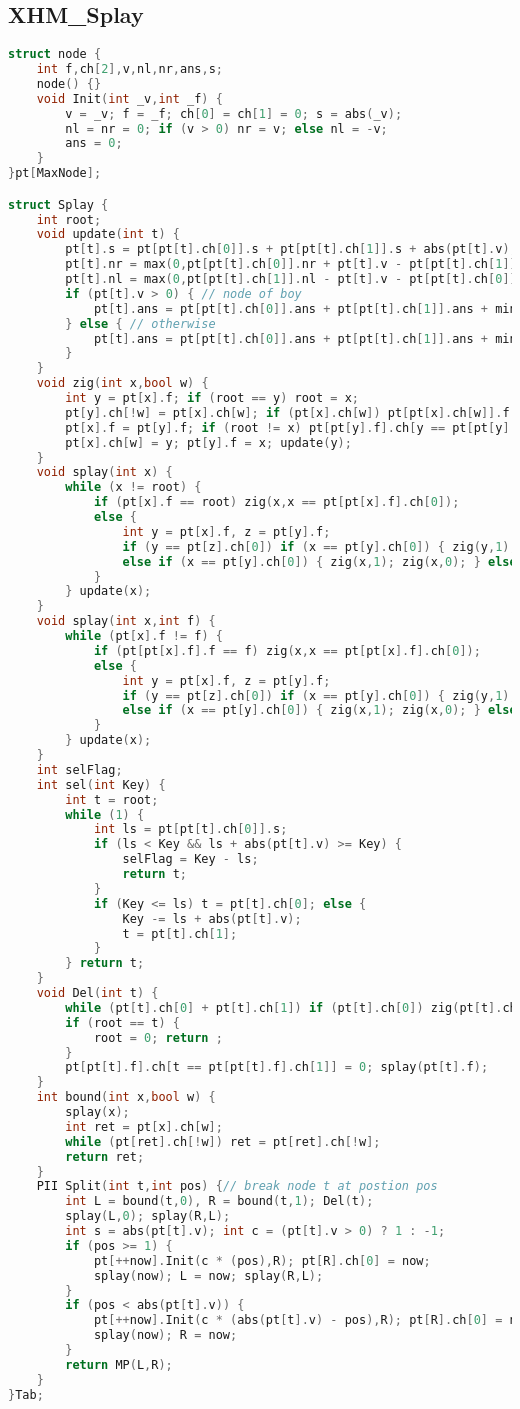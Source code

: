 \subsection{XHM\_Splay}
\begin{lstlisting}[language=C++]
struct node {
	int f,ch[2],v,nl,nr,ans,s;
	node() {}
	void Init(int _v,int _f) {
		v = _v; f = _f; ch[0] = ch[1] = 0; s = abs(_v);
		nl = nr = 0; if (v > 0) nr = v; else nl = -v;
		ans = 0;
	}
}pt[MaxNode];

struct Splay {
	int root;
	void update(int t) {
		pt[t].s = pt[pt[t].ch[0]].s + pt[pt[t].ch[1]].s + abs(pt[t].v);
		pt[t].nr = max(0,pt[pt[t].ch[0]].nr + pt[t].v - pt[pt[t].ch[1]].nl) + pt[pt[t].ch[1]].nr;
		pt[t].nl = max(0,pt[pt[t].ch[1]].nl - pt[t].v - pt[pt[t].ch[0]].nr) + pt[pt[t].ch[0]].nl;
		if (pt[t].v > 0) { // node of boy
			pt[t].ans = pt[pt[t].ch[0]].ans + pt[pt[t].ch[1]].ans + min(pt[pt[t].ch[0]].nr + pt[t].v,pt[pt[t].ch[1]].nl);
		} else { // otherwise
			pt[t].ans = pt[pt[t].ch[0]].ans + pt[pt[t].ch[1]].ans + min(pt[pt[t].ch[0]].nr,pt[pt[t].ch[1]].nl - pt[t].v);
		}
	}
	void zig(int x,bool w) {
		int y = pt[x].f; if (root == y) root = x;
		pt[y].ch[!w] = pt[x].ch[w]; if (pt[x].ch[w]) pt[pt[x].ch[w]].f = y;
		pt[x].f = pt[y].f; if (root != x) pt[pt[y].f].ch[y == pt[pt[y].f].ch[1]] = x;
		pt[x].ch[w] = y; pt[y].f = x; update(y);
	}
	void splay(int x) {
		while (x != root) {
			if (pt[x].f == root) zig(x,x == pt[pt[x].f].ch[0]);
			else {
				int y = pt[x].f, z = pt[y].f;
				if (y == pt[z].ch[0]) if (x == pt[y].ch[0]) { zig(y,1); zig(x,1); } else { zig(x,0); zig(x,1); }
				else if (x == pt[y].ch[0]) { zig(x,1); zig(x,0); } else { zig(y,0); zig(x,0); }
			}
		} update(x);
	}
	void splay(int x,int f) {
		while (pt[x].f != f) {
			if (pt[pt[x].f].f == f) zig(x,x == pt[pt[x].f].ch[0]);
			else {
				int y = pt[x].f, z = pt[y].f;
				if (y == pt[z].ch[0]) if (x == pt[y].ch[0]) { zig(y,1); zig(x,1); } else { zig(x,0); zig(x,1); }
				else if (x == pt[y].ch[0]) { zig(x,1); zig(x,0); } else { zig(y,0); zig(x,0); }
			}
		} update(x);
	}
	int selFlag;
	int sel(int Key) {
		int t = root;
		while (1) {
			int ls = pt[pt[t].ch[0]].s;
			if (ls < Key && ls + abs(pt[t].v) >= Key) {
				selFlag = Key - ls;
				return t;
			}
			if (Key <= ls) t = pt[t].ch[0]; else {
				Key -= ls + abs(pt[t].v);
				t = pt[t].ch[1];
			}
		} return t;
	}
	void Del(int t) {
		while (pt[t].ch[0] + pt[t].ch[1]) if (pt[t].ch[0]) zig(pt[t].ch[0],1); else zig(pt[t].ch[1],0); 
		if (root == t) {
			root = 0; return ;
		}
		pt[pt[t].f].ch[t == pt[pt[t].f].ch[1]] = 0; splay(pt[t].f);
	}
	int bound(int x,bool w) {
		splay(x);
		int ret = pt[x].ch[w];
		while (pt[ret].ch[!w]) ret = pt[ret].ch[!w];
		return ret;
	}
	PII Split(int t,int pos) {// break node t at postion pos
		int L = bound(t,0), R = bound(t,1); Del(t);
		splay(L,0); splay(R,L); 
		int s = abs(pt[t].v); int c = (pt[t].v > 0) ? 1 : -1;
		if (pos >= 1) {
			pt[++now].Init(c * (pos),R); pt[R].ch[0] = now;
			splay(now); L = now; splay(R,L);
		}
		if (pos < abs(pt[t].v)) {
			pt[++now].Init(c * (abs(pt[t].v) - pos),R); pt[R].ch[0] = now;
			splay(now); R = now; 
		}
		return MP(L,R);
	}
}Tab;
\end{lstlisting}

